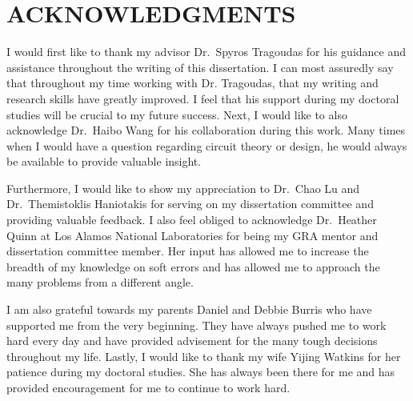 


\chapter*{ACKNOWLEDGMENTS}

I would first like to thank my advisor Dr.\ Spyros Tragoudas for his guidance and assistance throughout the writing of this dissertation. I can most assuredly say that throughout my time working with Dr. Tragoudas, that my writing and research skills have greatly improved. I feel that his support during my doctoral studies will be crucial to my future success. Next, I would like to also acknowledge Dr.\ Haibo Wang for his collaboration during this work. Many times when I would have a question regarding circuit theory or design, he would always be available to provide valuable insight.

Furthermore, I would like to show my appreciation to Dr.\ Chao Lu and Dr.\ Themistoklis Haniotakis for serving on my dissertation committee and providing valuable feedback. I also feel obliged to acknowledge Dr.\ Heather Quinn at Los Alamos National Laboratories for being my GRA mentor and dissertation committee member. Her input has allowed me to increase the breadth of my knowledge on soft errors and has allowed me to approach the many problems from a different angle. 

I am also grateful towards my parents Daniel and Debbie Burris who have supported me from the very beginning. They have always pushed me to work hard every day and have provided advisement for the many tough decisions throughout my life. Lastly, I would like to thank my wife Yijing Watkins for her patience during my doctoral studies. She has always been there for me and has provided encouragement for me to continue to work hard.  

\newpage
